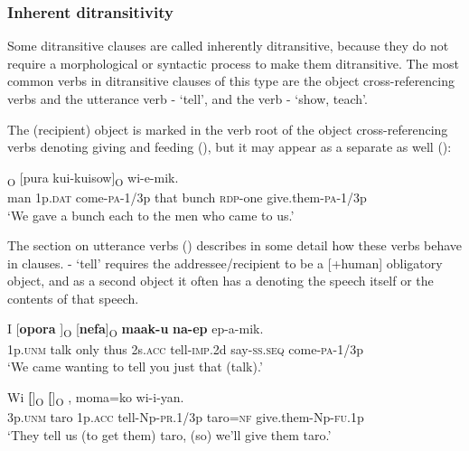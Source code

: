 \subsubsection[Inherent ditransitivity ]{Inherent ditransitivity} 
{}
Some  ditransitive clauses are called inherently ditransitive, because they do not require a morphological or syntactic process to make them ditransitive. The most common verbs in ditransitive clauses of this type are the object cross-referencing verbs and the utterance verb - `tell', and the verb - `show, teach'.

The (recipient) object is marked in the verb root of the object cross-referencing verbs denoting giving and feeding (), but it may appear as a separate  as well ():

\ea%
\label{ex:x950}
\textsubscript{O}  [pura  kui-kuisow]\textsubscript{O} wi-e-mik. \\
     man  1p.\textsc{dat}  come-\textsc{pa}-1/3p  that  bunch  \textsc{rdp}-one give.them-\textsc{pa}-1/3p \\
\glt `We gave a bunch each to the men who came to us.'
\z

The section on utterance verbs () describes in some detail how these verbs behave in clauses. - `tell' requires the addressee/recipient to be a [+human] obligatory object, and as a second object it often has a  denoting the speech itself or the contents of that speech. 

\ea%
\label{ex:x1839}
\gll I  [\textbf{opora}  ]\textsubscript{O}  [\textbf{nefa}]\textsubscript{O} \textbf{maak-u} \textbf{na-ep} ep-a-mik. \\
     1p.\textsc{unm}  talk  only  thus  2s.\textsc{acc}  tell-\textsc{imp}.2d  say-\textsc{ss}.\textsc{seq} come-\textsc{pa}-1/3p \\
\glt `We came wanting to tell you just that (talk).'
\z

\ea%
\label{ex:x955}
\gll Wi  \textbf{[}]\textsubscript{O}  \textbf{[}]\textsubscript{O}  ,  moma=ko wi-i-yan. \\
     3p.\textsc{unm}  taro  1p.\textsc{acc}  tell-Np-\textsc{pr}.1/3p  taro=\textsc{nf} give.them-Np-\textsc{fu}.1p \\
\glt `They tell us (to get them) taro, (so) we'll give them taro.'
\z

